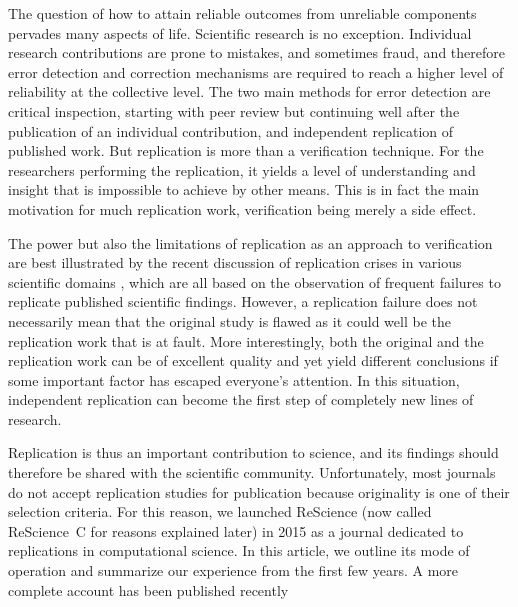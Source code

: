 \documentclass[runningheads]{llncs}
\begin{document}
The question of how to attain reliable outcomes from unreliable components pervades many aspects of life. Scientific research is no exception. Individual research contributions are prone to mistakes, and sometimes fraud, and therefore error detection and correction mechanisms are required to reach a higher level of reliability at the collective level. The two main methods for error detection are critical inspection, starting with peer review but continuing well after the publication of an individual contribution, and independent replication of published work. But replication is more than a verification technique. For the researchers performing the replication, it yields a level of understanding and insight that is impossible to achieve by other means. This is in fact the main motivation for much replication work, verification being merely a side effect.

The power but also the limitations of replication as an approach to verification are best illustrated by the recent discussion of replication crises in various scientific domains
\cite{IoannidisWhyMostPublished2005,Baker500scientistslift2016,Munafomanifestoreproduciblescience2017,IqbalReproducibleResearchPractices2016}, which are all based on the observation of frequent failures to replicate published scientific findings. However, a replication failure does not necessarily mean that the original study is flawed as it could well be the replication work that is at fault. More interestingly, both the original and the replication work can be of excellent quality and yet yield different conclusions if some important factor has escaped everyone's attention. In this situation, independent replication can become the first step of completely new lines of research.

Replication is thus an important contribution to science, and its findings should therefore be shared with the scientific community. Unfortunately, most journals do not accept replication studies for publication because originality is one of their selection criteria. For this reason, we launched ReScience  (now called ReScience~C for reasons explained later) in 2015 as a journal dedicated to replications in computational science. In this article, we outline its mode of operation and summarize our experience from the first few years. A more complete account has been published recently \cite{RougierSustainablecomputationalscience2017}


%
%


%
\end{document}
